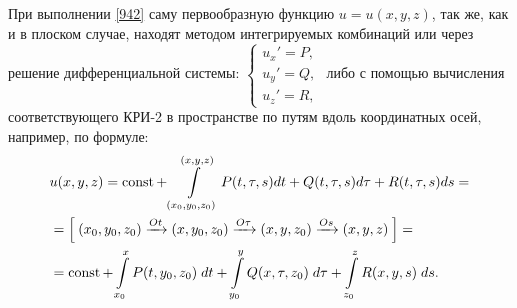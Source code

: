 \begin{notes}
    При выполнении \eqref{942} саму первообразную функцию $ u = u(x, y, z) $, так же, как и в плоском случае, находят методом интегрируемых комбинаций или через решение дифференциальной системы:
    $ \begin{cases}
            u_x' = P, \\ u_y' = Q,  \\ u_z' = R,
    \end{cases} $
    либо с помощью вычисления соответствующего КРИ-2 в пространстве по путям вдоль координатных осей, например, по формуле:
    \begin{align*}
        & u(x, y, z) = \operatorname{\text{const}} + \int\limits_{(x_0, y_0, z_0)}^{(x, y, z) } P(t, \tau, s) dt + Q(t, \tau, s) d \tau + R(t, \tau, s) ds = \\
        & = \left[\dfrac{ }{}
            (x_0, y_0, z_0) \xrightarrow{Ot}
            (x, y_0, z_0) \xrightarrow{O\tau}
            (x, y, z_0) \xrightarrow{Os}
            (x, y, z)
        \dfrac{ }{}\right] = \\
        & = \operatorname{\text{const}} + \int\limits_{x_0}^x P(t, y_0, z_0) \; dt + 
        \int\limits_{y_0}^y Q(x, \tau, z_0) \; d\tau + \int\limits_{z_0}^z R(x, y, s) \; ds. 
    \end{align*}
\end{notes}

$  $
\newpage
$  $
